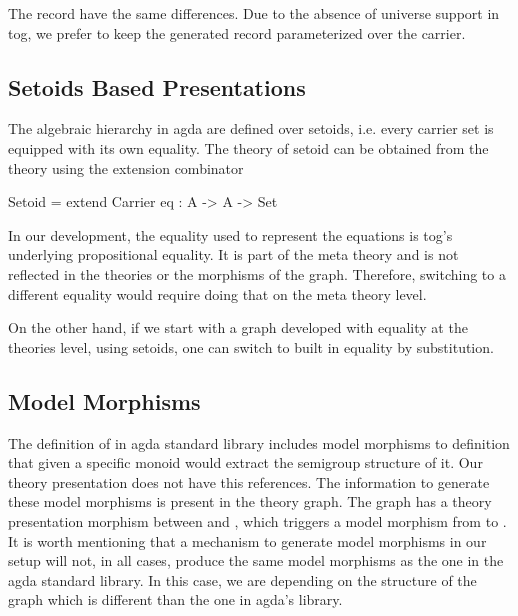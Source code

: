 The record  have the same differences. Due to the absence of universe support in tog, we prefer to keep the generated  record parameterized over the carrier. 

\subsection{Setoids Based Presentations}
\label{subsec:setoid-based-pres}
The algebraic hierarchy in agda are defined over setoids, i.e. every carrier set is equipped with its own equality. 
The theory of setoid can be obtained from the  theory using the extension combinator 
\begin{togcode}
Setoid = extend Carrier {eq : A -> A -> Set}
\end{togcode}
In our development, the equality used to represent the equations is tog's underlying propositional equality. It is part of the meta theory and is not reflected in the theories or the morphisms of the graph. Therefore, switching to a different equality would require doing that on the meta theory level. 

On the other hand, if we start with a graph developed with equality at the theories level, using setoids, one can switch to built in equality by substitution. 





\subsection{Model Morphisms} 
\label{subsec:model-morph}
\label{subsec:agda:modelMorphisms}
The definition of  in agda standard library includes model morphisms to   definition that given a specific monoid would extract the semigroup structure of it. Our theory presentation does not have this references. The information to generate these model morphisms is present in the theory graph. The graph has a theory presentation morphism between  and , which triggers a model morphism from  to . It is worth mentioning that a mechanism to generate model morphisms in our setup will not, in all cases, produce the same model morphisms as the one in the agda standard library. In this case, we are depending on the structure of the graph which is different than the one in agda's library. 

